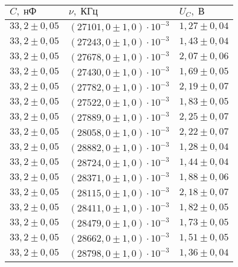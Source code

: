 \begin{tabular}{|l|l|l|}
\hline
$C,\;\text{нФ}$ & $\nu,\;\text{КГц}$ & $U_C,\;\text{В}$\\\hline
$33{,}2 \pm 0{,}05$ & $\left(27101{,}0 \pm 1{,}0\right)\cdot 10^{-3}$ & $1{,}27 \pm 0{,}04$\\\hline
$33{,}2 \pm 0{,}05$ & $\left(27243{,}0 \pm 1{,}0\right)\cdot 10^{-3}$ & $1{,}43 \pm 0{,}04$\\\hline
$33{,}2 \pm 0{,}05$ & $\left(27678{,}0 \pm 1{,}0\right)\cdot 10^{-3}$ & $2{,}07 \pm 0{,}06$\\\hline
$33{,}2 \pm 0{,}05$ & $\left(27430{,}0 \pm 1{,}0\right)\cdot 10^{-3}$ & $1{,}69 \pm 0{,}05$\\\hline
$33{,}2 \pm 0{,}05$ & $\left(27782{,}0 \pm 1{,}0\right)\cdot 10^{-3}$ & $2{,}19 \pm 0{,}07$\\\hline
$33{,}2 \pm 0{,}05$ & $\left(27522{,}0 \pm 1{,}0\right)\cdot 10^{-3}$ & $1{,}83 \pm 0{,}05$\\\hline
$33{,}2 \pm 0{,}05$ & $\left(27889{,}0 \pm 1{,}0\right)\cdot 10^{-3}$ & $2{,}25 \pm 0{,}07$\\\hline
$33{,}2 \pm 0{,}05$ & $\left(28058{,}0 \pm 1{,}0\right)\cdot 10^{-3}$ & $2{,}22 \pm 0{,}07$\\\hline
$33{,}2 \pm 0{,}05$ & $\left(28882{,}0 \pm 1{,}0\right)\cdot 10^{-3}$ & $1{,}28 \pm 0{,}04$\\\hline
$33{,}2 \pm 0{,}05$ & $\left(28724{,}0 \pm 1{,}0\right)\cdot 10^{-3}$ & $1{,}44 \pm 0{,}04$\\\hline
$33{,}2 \pm 0{,}05$ & $\left(28371{,}0 \pm 1{,}0\right)\cdot 10^{-3}$ & $1{,}88 \pm 0{,}06$\\\hline
$33{,}2 \pm 0{,}05$ & $\left(28115{,}0 \pm 1{,}0\right)\cdot 10^{-3}$ & $2{,}18 \pm 0{,}07$\\\hline
$33{,}2 \pm 0{,}05$ & $\left(28411{,}0 \pm 1{,}0\right)\cdot 10^{-3}$ & $1{,}82 \pm 0{,}05$\\\hline
$33{,}2 \pm 0{,}05$ & $\left(28479{,}0 \pm 1{,}0\right)\cdot 10^{-3}$ & $1{,}73 \pm 0{,}05$\\\hline
$33{,}2 \pm 0{,}05$ & $\left(28662{,}0 \pm 1{,}0\right)\cdot 10^{-3}$ & $1{,}51 \pm 0{,}05$\\\hline
$33{,}2 \pm 0{,}05$ & $\left(28798{,}0 \pm 1{,}0\right)\cdot 10^{-3}$ & $1{,}36 \pm 0{,}04$\\\hline
\end{tabular}
